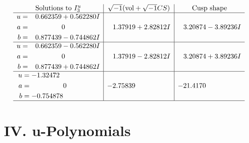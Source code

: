 \documentclass[1p]{elsarticle_modified}
\theoremstyle{definition}
\newcommand{\I}{\sqrt{-1}}
\begin{document}
$$\begin{array}{c|c|c}  
\text{Solutions to }I^u_{3}& \I (\text{vol} + \sqrt{-1}CS) & \text{Cusp shape}\\
 \hline 
\begin{aligned}
u &= \phantom{-}0.662359 + 0.562280 I \\
a &= \phantom{-0.000000 } 0 \\
b &= \phantom{-}0.877439 - 0.744862 I\end{aligned}
 & \phantom{-}1.37919 + 2.82812 I & \phantom{-}3.20874 - 3.89236 I \\ \hline\begin{aligned}
u &= \phantom{-}0.662359 - 0.562280 I \\
a &= \phantom{-0.000000 } 0 \\
b &= \phantom{-}0.877439 + 0.744862 I\end{aligned}
 & \phantom{-}1.37919 - 2.82812 I & \phantom{-}3.20874 + 3.89236 I \\ \hline\begin{aligned}
u &= -1.32472\phantom{ +0.000000I} \\
a &= \phantom{-0.000000 } 0 \\
b &= -0.754878\phantom{ +0.000000I}\end{aligned}
 & -2.75839\phantom{ +0.000000I} & -21.4170\phantom{ +0.000000I}\\
 \hline 
 \end{array}$$\newpage
\newpage\renewcommand{\arraystretch}{1}
\centering \section*{ IV. u-Polynomials}
\end{document}
